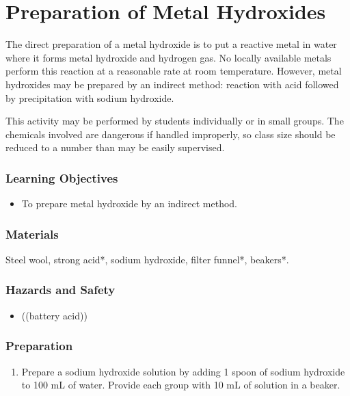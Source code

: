 \section{Preparation of Metal Hydroxides}

The direct preparation of a metal hydroxide is to put a reactive metal in water where it forms metal hydroxide and hydrogen gas. No locally available metals perform this reaction at a reasonable rate at room temperature. However, metal hydroxides may be prepared by an indirect method: reaction with acid followed by precipitation with sodium hydroxide.

This activity may be performed by students individually or in small groups. The chemicals involved are dangerous if handled improperly, so class size should be reduced to a number than may be easily supervised.

\subsubsection*{Learning Objectives}
\begin{itemize}
\item{To prepare metal hydroxide by an indirect method.}
\end{itemize}

\subsubsection*{Materials}
Steel wool, strong acid*, sodium hydroxide, filter funnel*, beakers*.

\subsubsection*{Hazards and Safety}
\begin{itemize}
\item{((battery acid))}
\end{itemize}

\subsubsection*{Preparation}
\begin{enumerate}
\item{Prepare a sodium hydroxide solution by adding 1 spoon of sodium hydroxide to 100 mL of water. Provide each group with 10 mL of solution in a beaker.}
\end{enumerate}

